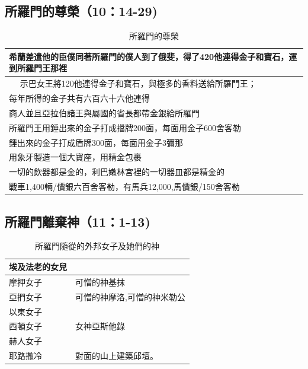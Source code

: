\documentclass{ctexart}
\begin{document}
\subsection{所羅門的尊榮（10：14-29)}
\begin{table}[!hbp]
\centering 
\begin{tabular}{|p{16cm}|}
\hline
\hline
希蘭差遣他的臣僕同著所羅門的僕人到了俄斐，得了420他連得金子和寶石，運到所羅門王那裡\\\hline\hline　
示巴女王將120他連得金子和寶石，與極多的香料送給所羅門王；\\\hline
每年所得的金子共有六百六十六他連得\\\hline
商人並且亞拉伯諸王與屬國的省長都帶金銀給所羅門\\\hline
所羅門王用錘出來的金子打成擋牌200面，每面用金子600舍客勒\\\hline
錘出來的金子打成盾牌300面，每面用金子3彌那\\\hline
用象牙製造一個大寶座，用精金包裹\\\hline
一切的飲器都是金的，利巴嫩林宮裡的一切器皿都是精金的\\\hline
戰車1,400輛/價銀六百舍客勒，有馬兵12,000,馬價銀/150舍客勒\\\hline
\end{tabular}
\caption{所羅門的尊榮}
\end{table}

\subsection{所羅門離棄神（11：1-13)}
\begin{table}[!hbp]
\centering 
\begin{tabular}{|p{4cm}|p{6cm}|}
\hline
\hline
埃及法老的女兒&\\\hline
摩押女子&可憎的神基抹\\\hline
亞捫女子&可憎的神摩洛,可憎的神米勒公\\\hline
以東女子&\\\hline
西頓女子&女神亞斯他錄\\\hline
赫人女子&\\\hline
耶路撒冷&對面的山上建築邱壇。\\\hline
\end{tabular}
\caption{所羅門隨從的外邦女子及她們的神}
\end{table}
\end{document}
